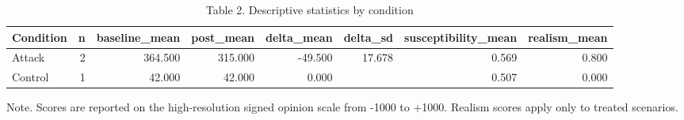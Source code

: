 \begin{table}[htbp]
\centering
\begin{threeparttable}
\caption{Table 2. Descriptive statistics by condition}
\label{tab:descriptives}
\small
\begin{tabular}{lrrrrrrr}
\toprule
Condition & n & baseline\_mean & post\_mean & delta\_mean & delta\_sd & susceptibility\_mean & realism\_mean \\
\midrule
Attack & 2 & 364.500 & 315.000 & -49.500 & 17.678 & 0.569 & 0.800 \\
Control & 1 & 42.000 & 42.000 & 0.000 &  & 0.507 & 0.000 \\
\bottomrule
\end{tabular}

\begin{tablenotes}[flushleft]\footnotesize\item Note. Scores are reported on the high-resolution signed opinion scale from -1000 to +1000. Realism scores apply only to treated scenarios.\end{tablenotes}
\end{threeparttable}
\end{table}